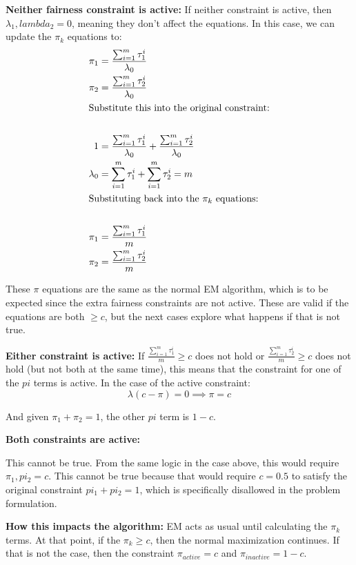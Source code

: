 \documentclass[12pt]{article}
\begin{document}
{\bf Neither fairness constraint is active:} 
If neither constraint is active, then $\lambda_1, lambda_2 = 0$, meaning they don't affect the equations. In this case, we can update the $\pi_k$ equations to:
\begin{align*}
    \pi_1 &= \frac{\sum_{i=1}^m \tau_1^i}{\lambda_0} \\
    \pi_2 &= \frac{\sum_{i=1}^m \tau_2^i}{\lambda_0} \\
    \intertext{Substitute this into the original constraint:}\\
    1 &=\frac{\sum_{i=1}^m \tau_1^i}{\lambda_0}+ \frac{\sum_{i=1}^m \tau_2^i}{\lambda_0} \\
    \lambda_0 &= \sum_{i=1}^m \tau_1^i + \sum_{i=1}^m \tau_2^i = m\\
    \intertext{Substituting back into the $\pi_k$ equations:}\\
    \pi_1 &= \frac{\sum_{i=1}^m \tau_1^i}{m} \\
    \pi_2 &= \frac{\sum_{i=1}^m \tau_2^i}{m} \\
\end{align*}

These $\pi$ equations are the same as the normal EM algorithm, which is to be expected since the extra fairness constraints are not active. These are valid if the equations are both $\geq c$, but the next cases explore what happens if that is not true.

{\bf Either constraint is active:}
If $\frac{\sum_{i=1}^m \tau_1^i}{m} \geq c$ does not hold or  $\frac{\sum_{i=1}^m \tau_2^i}{m} \geq c$ does not hold (but not both at the same time), this means that the constraint for one of the $pi$ terms is active. In the case of the active constraint:
\[
\lambda(c-\pi) = 0 \implies \pi = c
\]

And given $\pi_1 + \pi_2 = 1$, the other $pi$ term is $1-c$.

{\bf Both constraints are active:}

This cannot be true. From the same logic in the case above, this would require $\pi_1,pi_2 = c$. This cannot be true because that would require $c=0.5$ to satisfy the original constraint $pi_1 + pi_2 = 1$, which is specifically disallowed in the problem formulation.

{\bf How this impacts the algorithm:}
EM acts as usual until calculating the $\pi_k$ terms. At that point, if the $\pi_k \geq c$, then the normal maximization continues. If that is not the case, then the constraint $\pi_{active} = c$ and $\pi_{inactive} = 1-c$.
\end{document}
